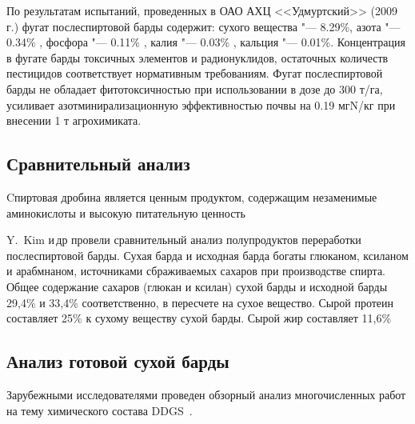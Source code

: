 По результатам испытаний, проведенных в ОАО АХЦ <<Удмуртский>> (2009 г.) фугат послеспиртовой барды содержит: сухого вещества "--- 8.29\%, азота "--- 0.34\% , фосфора "--- 0.11\% , калия "--- 0.03\% , кальция "--- 0.01\%.
Концентрация в фугате барды токсичных элементов и радионуклидов, остаточных количеств пестицидов соответствует нормативным требованиям.
Фугат послеспиртовой барды не обладает фитотоксичностью при использовании в дозе до 300 т/га, усиливает азотминирализационную эффективностью почвы на 0.19 мгN/кг при внесении 1 т агрохимиката.~\cite{Makarov.Ocenka.2010}


\subsection{Сравнительный анализ}


Cпиртовая дробина является ценным продуктом, содержащим незаменимые аминокислоты и высокую питательную ценность~\cite{Oleinikov.Svoystva.2010}






Y.~Kim и\,др провели сравнительный анализ полупродуктов переработки послеспиртовой барды.
Сухая барда и исходная барда богаты глюканом, ксиланом и арабмнаном, источниками сбраживаемых сахаров при производстве спирта.
Общее содержание сахаров (глюкан и ксилан) сухой барды и исходной барды 29,4\% и 33,4\% соответственно, в пересчете на сухое вещество.
Сырой протеин составляет 25\% к сухому веществу сухой барды.
Сырой жир составляет 11,6\%~\cite[pp.~5171--5172]{Kim.Composition.2008}



\subsection{Анализ готовой сухой барды}


Зарубежными исследователями проведен обзорный анализ многочисленных работ на тему химического состава DDGS~\cite{Liu.Chemical.2011}.




